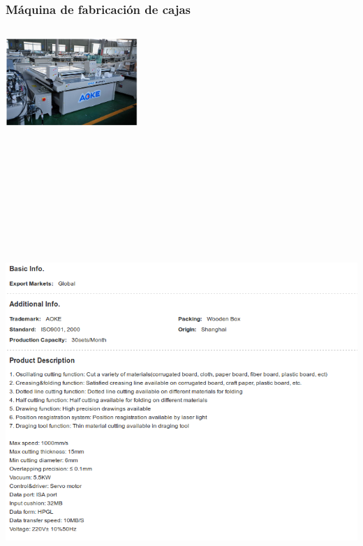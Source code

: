\subsubsection{Máquina de fabricación de cajas}
\includegraphics[width=5cm,height=4cm,keepaspectratio]{Datasheets/6Foto.png} 
\\
\includegraphics[width=15cm,height=20cm,keepaspectratio]{Datasheets/6MaquinaCajas.png} 
\newpage

